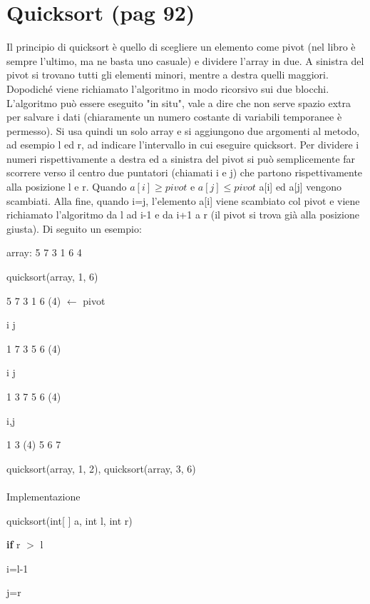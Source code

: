 \documentclass[a4paper]{book}
\begin{document}
\section{Quicksort (pag 92)}
Il principio di quicksort è quello di scegliere un elemento come pivot (nel libro è sempre l'ultimo, ma ne basta uno casuale) e dividere l'array in due. A sinistra del pivot si trovano tutti gli elementi minori, mentre a destra quelli maggiori. Dopodiché viene richiamato l'algoritmo in modo ricorsivo sui due blocchi. L'algoritmo può essere eseguito "in situ", vale a dire che non serve spazio extra per salvare i dati (chiaramente un numero costante di variabili temporanee è permesso). Si usa quindi un solo array e si aggiungono due argomenti al metodo, ad esempio l ed r, ad indicare l'intervallo in cui eseguire quicksort. Per dividere i numeri rispettivamente a destra ed a sinistra del pivot si può semplicemente far scorrere verso il centro due puntatori (chiamati i e j) che partono rispettivamente alla posizione l e r. Quando $a[i] \geq pivot$ e $a[j] \leq pivot$ a[i] ed a[j] vengono scambiati. Alla fine, quando i=j, l'elemento a[i] viene scambiato col pivot e viene richiamato l'algoritmo da l ad i-1 e da i+1 a r (il pivot si trova già alla posizione giusta). Di seguito un esempio:

array: 5 7 3 1 6 4

quicksort(array, 1, 6)

5 7 3 1 6 (4) $\leftarrow$ pivot

i\hspace{2em}       j 

1 7 3 5 6 (4)

\hspace{0.8em}  i j
  
1 3 7 5 6 (4)

\hspace{1,3em}   i,j
   
1 3 (4) 5 6 7

quicksort(array, 1, 2), quicksort(array, 3, 6)
      
\paragraph{}Implementazione

quicksort(int[ ] a, int l, int r)

\textbf{if} r $>$ l

\hspace{2em} i=l-1

\hspace{2em} j=r
\end{document}
